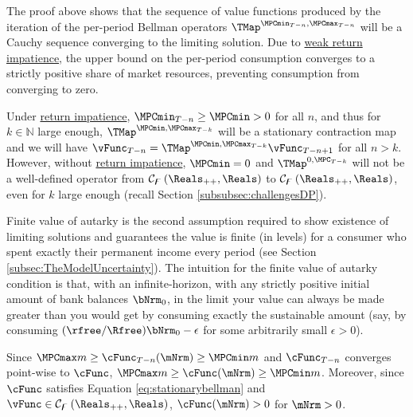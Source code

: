 \documentclass[BufferStockTheory]{subfiles}
\begin{document}
The proof above shows that the sequence of value functions produced by the iteration of the per-period Bellman operators $\TMap^{\MPCmin_{T-n}, \MPCmax_{T-n}}$  will be a Cauchy sequence converging to the limiting solution.
Due to \hyperlink{WRIC}{weak return impatience}, the upper bound on the per-period consumption converges to a strictly positive share of market resources, preventing consumption from converging to zero.








\begin{remark}
Under \hyperlink{RIC}{return impatience}, $\MPCmin_{T-n}\geq \MPCmin>0$ for all $n$, and thus for $k\in \mathbb{N}$ large enough, $\TMap^{\MPCmin, \MPCmax_{T-k}}$ will be a stationary contraction map and we will  have $\vFunc_{T-n} = \TMap^{\MPCmin, \MPCmax_{T-k}}\vFunc_{T-n+1}$ for all $n>k$. However, without \hyperlink{RIC}{return impatience}, $\MPCmin = 0$ and $\TMap^{0, \MPC_{T-k}}$ will not be a well-defined operator from  $\mathcal{C}_{\boundFunc }\left(\Reals_{++},\Reals\right)$ to $\mathcal{C}_{\boundFunc }\left(\Reals_{++},\Reals\right)$, even for $k$ large enough (recall Section \ref{subsubsec:challengesDP}).
\end{remark}



Finite value of autarky is the second assumption required to show existence of limiting solutions and guarantees the value is finite (in levels) for a consumer who spent exactly their permanent income every period (see Section \ref{subsec:TheModelUncertainty}).
The intuition for the finite value of autarky condition is that, with an infinite-horizon, with any strictly positive initial amount of bank balances $\bNrm_{0}$, in the limit your value can always be made greater than you would get by consuming exactly the sustainable amount (say, by consuming $(\rfree/\Rfree)\bNrm_{0}-\epsilon$ for some arbitrarily small $\epsilon>0$).

\begin{remark}\label{remark:cStatStrctPos}
Since $\MPCmax m \geq \cFunc_{T-n}(\mNrm)\geq \MPCmin m$ and $\cFunc_{T-n}$ converges point-wise to $\cFunc$, $\MPCmax m \geq \cFunc(\mNrm)\geq \MPCmin m$. Moreover, since $\cFunc$ satisfies  Equation \eqref{eq:stationarybellman} and $\vFunc \in \mathcal{C}_{\boundFunc }\left(\Reals_{++},\Reals\right) $, $\cFunc(\mNrm)>0$ for $\mNrm>0$. 
\end{remark}
\end{document}
